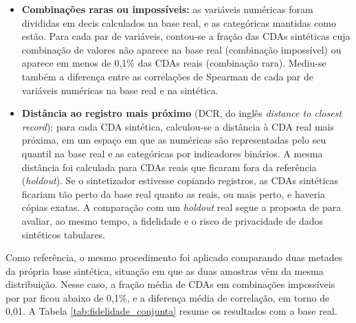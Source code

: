 \begin{itemize}
    \item \textbf{Combinações raras ou impossíveis:} as variáveis numéricas foram divididas em decis calculados na base real, e as categóricas mantidas como estão. Para cada par de variáveis, contou-se a fração das CDAs sintéticas cuja combinação de valores não aparece na base real (combinação impossível) ou aparece em menos de 0,1\% das CDAs reais (combinação rara). Mediu-se também a diferença entre as correlações de Spearman de cada par de variáveis numéricas na base real e na sintética.
    \item \textbf{Distância ao registro mais próximo} (DCR, do inglês \textit{distance to closest record}): para cada CDA sintética, calculou-se a distância à CDA real mais próxima, em um espaço em que as numéricas são representadas pelo seu quantil na base real e as categóricas por indicadores binários. A mesma distância foi calculada para CDAs reais que ficaram fora da referência (\textit{holdout}). Se o sintetizador estivesse copiando registros, as CDAs sintéticas ficariam tão perto da base real quanto as reais, ou mais perto, e haveria cópias exatas. A comparação com um \textit{holdout} real segue a proposta de  para avaliar, ao mesmo tempo, a fidelidade e o risco de privacidade de dados sintéticos tabulares.
\end{itemize}

Como referência, o mesmo procedimento foi aplicado comparando duas metades da própria base sintética, situação em que as duas amostras vêm da mesma distribuição. Nesse caso, a fração média de CDAs em combinações impossíveis por par ficou abaixo de 0,1\%, e a diferença média de correlação, em torno de 0,01. A Tabela \ref{tab:fidelidade_conjunta} resume os resultados com a base real.

